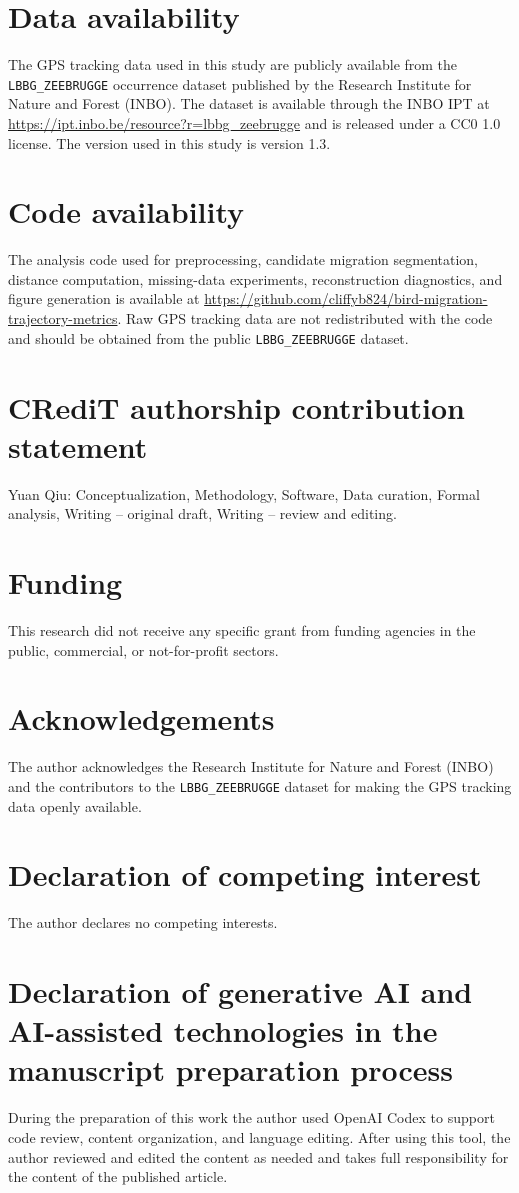 \documentclass[preprint,12pt,authoryear]{elsarticle}
\begin{document}


\section*{Data availability}
The GPS tracking data used in this study are publicly available from the
\texttt{LBBG\_ZEEBRUGGE} occurrence dataset published by the Research Institute
for Nature and Forest (INBO). The dataset is available through the INBO IPT at
\url{https://ipt.inbo.be/resource?r=lbbg_zeebrugge} and is released under a CC0
1.0 license. The version used in this study is version 1.3.

\section*{Code availability}
The analysis code used for preprocessing, candidate migration segmentation,
distance computation, missing-data experiments, reconstruction diagnostics, and
figure generation is
available at
\url{https://github.com/cliffyb824/bird-migration-trajectory-metrics}. Raw GPS
tracking data are not redistributed with the code and should be obtained from
the public \texttt{LBBG\_ZEEBRUGGE} dataset.

\section*{CRediT authorship contribution statement}
Yuan Qiu: Conceptualization, Methodology, Software, Data curation, Formal
analysis, Writing -- original draft, Writing -- review and editing.

\section*{Funding}
This research did not receive any specific grant from funding agencies in the
public, commercial, or not-for-profit sectors.

\section*{Acknowledgements}
The author acknowledges the Research Institute for Nature and Forest (INBO)
and the contributors to the \texttt{LBBG\_ZEEBRUGGE} dataset for making the GPS
tracking data openly available.

\section*{Declaration of competing interest}
The author declares no competing interests.

\section*{Declaration of generative AI and AI-assisted technologies in the manuscript preparation process}
During the preparation of this work the author used OpenAI Codex to support
code review, content organization, and language editing. After using this tool,
the author reviewed and edited the content as needed and takes full
responsibility for the content of the published article.



\end{document}
